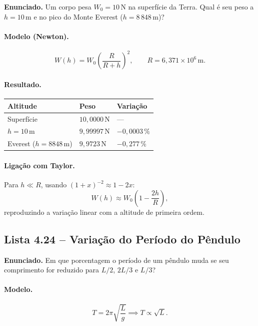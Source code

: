 \documentclass[12pt,a4paper]{article}
\theoremstyle{definition}
\begin{document}
\textbf{Enunciado.} Um corpo pesa $W_0 = 10\,\text{N}$ na superf\'icie da Terra.
Qual \'e seu peso a $h = 10\,\text{m}$ e no pico do Monte Everest ($h = 8\,848\,\text{m}$)?

\paragraph{Modelo (Newton).}
\begin{equation}
  W(h) = W_0\!\left(\frac{R}{R+h}\right)^{2}, \qquad R = 6{,}371\times10^{6}\,\text{m}.
\end{equation}

\paragraph{Resultado.}
\begin{center}
\begin{tabular}{lll}
\toprule
Altitude & Peso & Varia\c{c}\~ao\\
\midrule
Superf\'icie  & $10{,}0000\,\text{N}$ & ---\\
$h=10\,\text{m}$ & $9{,}99997\,\text{N}$ & $-0{,}0003\,\%$\\
Everest ($h=8848\,\text{m}$) & $9{,}9723\,\text{N}$ & $-0{,}277\,\%$\\
\bottomrule
\end{tabular}
\end{center}

\paragraph{Liga\c{c}\~ao com Taylor.}
Para $h\ll R$, usando $(1+x)^{-2}\approx 1-2x$:
\begin{equation}
  W(h)\approx W_0\!\left(1 - \frac{2h}{R}\right),
\end{equation}
reproduzindo a varia\c{c}\~ao linear com a altitude de primeira ordem.

\subsection{Lista 4.24 -- Varia\c{c}\~ao do Per\'iodo do P\^endulo}

\textbf{Enunciado.} Em que porcentagem o per\'iodo de um p\^endulo muda se seu
comprimento for reduzido para $L/2$, $2L/3$ e $L/3$?

\paragraph{Modelo.}
\begin{equation}
  T = 2\pi\sqrt{\frac{L}{g}} \implies T \propto \sqrt{L}.
\end{equation}
\end{document}
